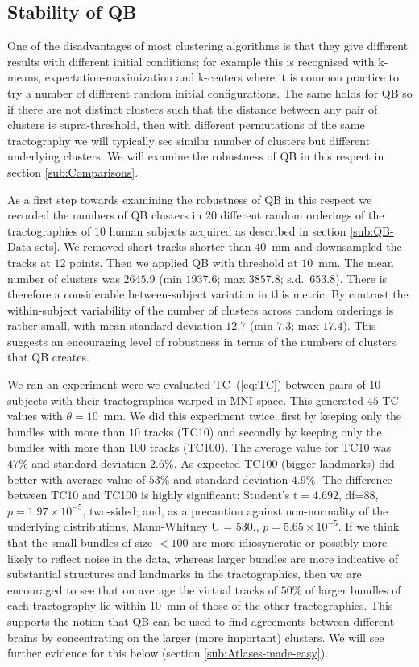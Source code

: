 \documentclass[preprint,authoryear,a4paper,10pt,onecolumn]{elsarticle}
\begin{document}
\subsection{Stability of QB\label{sub:Comparisons}}

One of the disadvantages of most clustering algorithms is that they give
different results with different initial conditions; for example this is
recognised with k-means, expectation-maximization
\citep{dempster1977maximum} and k-centers \citep{gonzalez1985clustering}
where it is common practice to try a number of different random initial
configurations. The same holds for QB so if there are not distinct
clusters such that the distance between any pair of clusters is
supra-threshold, then with different permutations of the same
tractography we will typically see similar number of clusters but
different underlying clusters. We will examine the robustness of QB in
this respect in section \ref{sub:Comparisons}.

As a first step towards examining the robustness of QB in this respect
we recorded the numbers of QB clusters in $20$ different random
orderings of the tractographies of $10$ human subjects acquired as
described in section \ref{sub:QB-Data-sets}. We removed short tracks
shorter than $40$~mm and downsampled the tracks at $12$ points. Then we
applied QB with threshold at $10$~mm. The mean number of clusters was
$2645.9$ (min $1937.6$; max $3857.8$; s.d.~$653.8$). There is therefore
a considerable between-subject variation in this metric. By contrast the
within-subject variability of the number of clusters across random
orderings is rather small, with mean standard deviation $12.7$ (min
$7.3$; max $17.4$). This suggests an encouraging level of robustness in
terms of the numbers of clusters that QB creates.

We ran an experiment were we evaluated TC~(\ref{eq:TC}) between pairs of
$10$ subjects with their tractographies warped in MNI space. This
generated $45$ TC values with $\theta=10$~mm. We did
this experiment twice; first by keeping only the bundles with more than
$10$ tracks (TC10) and secondly by keeping only the bundles with more
than $100$ tracks (TC100). The average value for TC10 was $47\%$ and
standard deviation $2.6\%$. As expected TC100 (bigger landmarks) did
better with average value of $53\%$ and standard deviation $4.9\%$. The
difference between TC10 and TC100 is highly significant: Student's
t$=4.692$, df=88, $p=1.97\times10^{-5}$, two-sided; and, as a precaution
against non-normality of the underlying distributions, Mann-Whitney U =
530., $p=5.65\times10^{-5}$. If we think that the small bundles of size
$<100$ are more idiosyncratic or possibly more likely to reflect noise
in the data, whereas larger bundles are more indicative of substantial
structures and landmarks in the tractographies, then we are encouraged
to see that on average the virtual tracks of $50\%$ of larger bundles of
each tractography lie within $10$~mm of those of the other
tractographies. This supports the notion that QB can be used to find
agreements between different brains by concentrating on the larger (more
important) clusters. We will see further evidence for this below
(section \ref{sub:Atlases-made-easy}).
\end{document}
